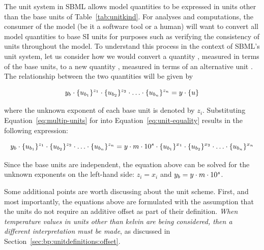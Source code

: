 The unit system in SBML allows model quantities to be expressed in
units other than the base units of Table~\ref{tab:unitkind}.  For
analyses and computations, the consumer of the model (be it a
software tool or a human) will want to convert all model
quantities to base SI units for purposes such as verifying the
consistency of units throughout the model.  To understand this
process in the context of SBML's unit system, let us consider how
we would convert a quantity \ybase, measured in terms of the base
units, to a new quantity \ynew, measured in terms of an
alternative unit \udef.  The relationship between the two
quantities will be given by
\begin{linenomath}
\begin{equation}
  y_b \cdot \{u_{b_1}\}^{z_1} \cdot \{u_{b_2}\}^{z_2} \cdot \ldots \cdot \{u_{b_n}\}^{z_n} = y  \cdot \{u\} 
\label{eq:unit-equality}
\end{equation}
\end{linenomath}
where the unknown exponent of each base unit is denoted by $z_i$.
Substituting Equation~\ref{eq:multip-units} for \udef into
Equation~\ref{eq:unit-equality} results in the following
expression:
\begin{linenomath}
\begin{equation}
  y_b \cdot \{u_{b_1}\}^{z_1} \cdot \{u_{b_2}\}^{z_2} \cdot \ldots \cdot \{u_{b_n}\}^{z_n}
    = y \cdot m \cdot 10^s \cdot \{u_{b_1}\}^{x_1} \cdot \{u_{b_2}\}^{x_2} \cdot \ldots \cdot \{u_{b_n}\}^{x_n}
\label{eq:unit-conversion}
\end{equation}
\end{linenomath}
Since the base units are independent, the equation above can be
solved for the unknown exponents on the left-hand side:
$z_i = x_i$ and $y_b = y \cdot m \cdot 10^s$.

Some additional points are worth discussing about the unit scheme.
First, and most importantly, the equations
above are formulated with the assumption that the units do
not require an additive offset as part of their definition.
\emph{When temperature values in units other than kelvin are being
  considered, then a different interpretation must be made}, as
discussed in Section~\ref{sec:bp:unitdefinitions:offset}.

